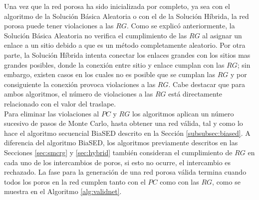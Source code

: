 Una vez que la red porosa ha sido inicializada por completo, ya sea con el algoritmo de la Solución Básica Aleatoria 
 o con el de la Solución Híbrida, la red porosa puede tener violaciones a las $RG$.
Como se explicó anteriormente, la Solución Básica Aleatoria no verifica el cumplimiento de las $RG$ al asignar un enlace a 
un sitio debido a que es un método completamente aleatorio. Por otra parte, la Solución Híbrida intenta conectar los enlaces grandes 
con los sitios mas grandes posibles, donde la conexión entre sitio y enlace cumplan con las $RG$; sin embargo, existen casos 
en los cuales no es posible que se cumplan las $RG$ y por consiguiente la conexión provoca violaciones a las $RG$. 
Cabe destacar que para ambos algoritmos, el número de violaciones a las $RG$ está directamente relacionado con el 
valor del traslape.\\



Para eliminar las violaciones al $PC$ y $RG$ los algoritmos aplican un número sucesivo de pasos de Monte Carlo, hasta obtener 
una red válida, tal y como lo hace el algoritmo secuencial BiaSED 
descrito en la Sección \ref{subsubsec:biased}. A diferencia del algoritmo BiaSED, los algoritmos previamente descritos 
 en las Secciones \ref{sec:smcrg} y \ref{sec:hybrid} también consideran el cumplimiento 
de $RG$ en cada uno de los intercambios de poros, si esto no ocurre, el intercambio es rechazado. La fase para la generación de una 
red porosa válida termina cuando todos los poros en la red cumplen tanto con el $PC$ como con las $RG$, como se muestra en 
el Algoritmo \ref{alg:validnet}.\\


